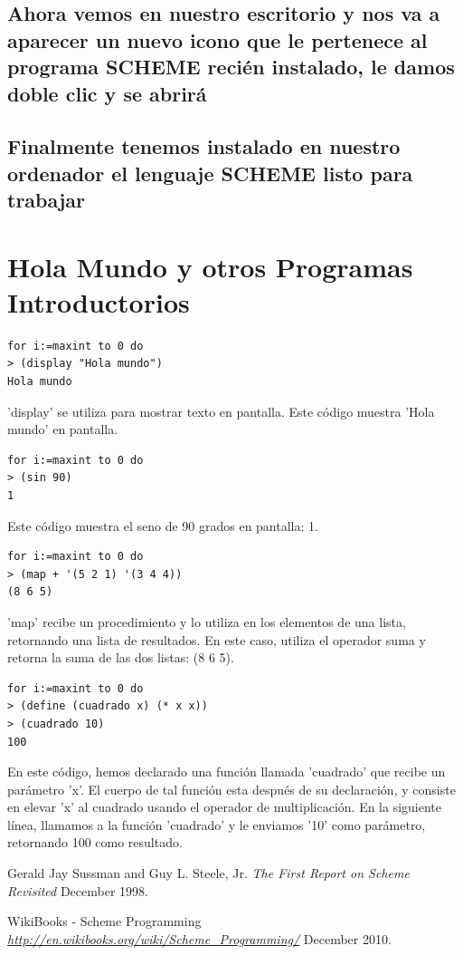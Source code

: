 \documentclass[11pt]{article} %
\begin{document}
\subsection{Ahora vemos en nuestro escritorio y nos va a aparecer un nuevo icono que le pertenece al programa SCHEME recién instalado, le damos doble clic y se abrirá}
\begin{center}
\end{center}

\subsection{Finalmente tenemos instalado en nuestro ordenador el lenguaje SCHEME listo para trabajar}
\begin{center}
\end{center}

\section{Hola Mundo y otros Programas Introductorios}

\begin{lstlisting}[frame=single]  % Start your code-block
for i:=maxint to 0 do
> (display "Hola mundo")
Hola mundo
\end{lstlisting}
'display' se utiliza para mostrar texto en pantalla. Este código muestra 'Hola mundo' en pantalla.

\begin{lstlisting}[frame=single]  % Start your code-block
for i:=maxint to 0 do
> (sin 90)
1
\end{lstlisting}
Este código muestra el seno de 90 grados en pantalla: 1.

\begin{lstlisting}[frame=single]  % Start your code-block
for i:=maxint to 0 do
> (map + '(5 2 1) '(3 4 4))
(8 6 5)
\end{lstlisting}
'map' recibe un procedimiento y lo utiliza en los elementos de una lista, retornando una lista de resultados.
En este caso, utiliza el operador suma y retorna la suma de las dos listas: (8 6 5).

\begin{lstlisting}[frame=single]  % Start your code-block
for i:=maxint to 0 do
> (define (cuadrado x) (* x x))
> (cuadrado 10)
100
\end{lstlisting}
En este código, hemos declarado una función llamada 'cuadrado' que recibe un parámetro 'x'. El cuerpo de tal función esta después de su declaración, y consiste en elevar 'x' al cuadrado usando el operador de multiplicación. En la siguiente línea, llamamos a la función 'cuadrado' y le enviamos '10' como parámetro, retornando 100 como resultado.
  
\begin{thebibliography}{1}

 Gerald Jay Sussman and Guy L. Steele, Jr. {\em The First Report on Scheme Revisited}  December 1998.

  WikiBooks - Scheme Programming {\em \url{http://en.wikibooks.org/wiki/Scheme_Programming/}} December 2010.

\end{thebibliography}
\end{document}
